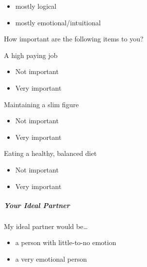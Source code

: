 \begin{multicols}{2}
 \begin{itemize}
  \item
        mostly logical
 \end{itemize}

 \begin{itemize}
  \item
        mostly emotional/intuitional
 \end{itemize}

 How important are the following items to you?

 A high paying job

 \begin{itemize}
  \item
        Not important
 \end{itemize}

 \begin{itemize}
  \item
        Very important
 \end{itemize}

 Maintaining a slim figure

 \begin{itemize}
  \item
        Not important
 \end{itemize}

 \begin{itemize}
  \item
        Very important
 \end{itemize}

 Eating a healthy, balanced diet

 \begin{itemize}
  \item
        Not important
 \end{itemize}

 \begin{itemize}
  \item
        Very important
 \end{itemize}

 \subparagraph{Your Ideal Partner}

 My ideal partner would be\ldots{}

 \begin{itemize}
  \item
        a person with little-to-no emotion
 \end{itemize}

 \begin{itemize}
  \item
        a very emotional person
 \end{itemize}


\end{multicols}
